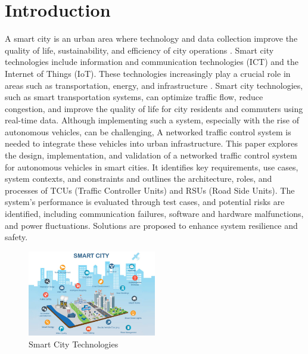 \section{Introduction}
\label{sec:intoduction}

A smart city is an urban area where technology and data collection improve the quality of life, sustainability, and efficiency of city operations \cite{b1}. Smart city technologies include information and communication technologies (ICT) and the Internet of Things (IoT). These technologies increasingly play a crucial role in areas such as transportation, energy, and infrastructure \cite{b2}. Smart city technologies, such as smart transportation systems, can optimize traffic flow, reduce congestion, and improve the quality of life for city residents and commuters using real-time data. Although implementing such a system, especially with the rise of autonomous vehicles, can be challenging, A networked traffic control system is needed to integrate these vehicles into urban infrastructure. 
This paper explores the design, implementation, and validation of a networked traffic control system for autonomous vehicles in smart cities. It identifies key requirements, use cases, system contexts, and constraints and outlines the architecture, roles, and processes of TCUs (Traffic Controller Units) and RSUs (Road Side Units). The system's performance is evaluated through test cases, and potential risks are identified, including communication failures, software and hardware malfunctions, and power fluctuations. Solutions are proposed to enhance system resilience and safety.

\begin{figure}[ht]
    \centering
    \includegraphics[width=0.5\textwidth]{images/smart-cities-infrastructure-iot-wide-768x512.jpg}
    \caption{Smart City Technologies \cite{b3}}
    \label{img:main_use_case}
\end{figure}

